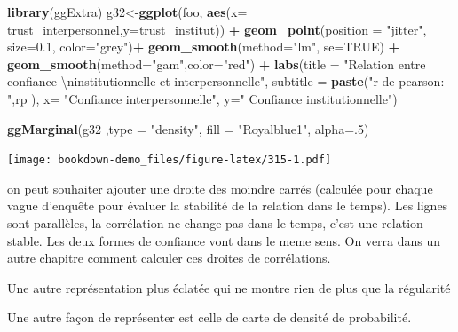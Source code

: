 \documentclass[
]{book}
\newenvironment{Shaded}{\begin{snugshade}}{\end{snugshade}}
\newcommand{\CharTok}[1]{\textcolor[rgb]{0.31,0.60,0.02}{#1}}
\newcommand{\DataTypeTok}[1]{\textcolor[rgb]{0.13,0.29,0.53}{#1}}
\newcommand{\DecValTok}[1]{\textcolor[rgb]{0.00,0.00,0.81}{#1}}
\newcommand{\FloatTok}[1]{\textcolor[rgb]{0.00,0.00,0.81}{#1}}
\newcommand{\KeywordTok}[1]{\textcolor[rgb]{0.13,0.29,0.53}{\textbf{#1}}}
\newcommand{\NormalTok}[1]{#1}
\newcommand{\OperatorTok}[1]{\textcolor[rgb]{0.81,0.36,0.00}{\textbf{#1}}}
\newcommand{\OtherTok}[1]{\textcolor[rgb]{0.56,0.35,0.01}{#1}}
\newcommand{\StringTok}[1]{\textcolor[rgb]{0.31,0.60,0.02}{#1}}
\begin{document}
\begin{Shaded}
\begin{Highlighting}[]
\KeywordTok{library}\NormalTok{(ggExtra)}
\NormalTok{g32<-}\KeywordTok{ggplot}\NormalTok{(foo, }\KeywordTok{aes}\NormalTok{(}\DataTypeTok{x=}\NormalTok{ trust_interpersonnel,}\DataTypeTok{y=}\NormalTok{trust_institut)) }\OperatorTok{+}
\StringTok{  }\KeywordTok{geom_point}\NormalTok{(}\DataTypeTok{position =} \StringTok{"jitter"}\NormalTok{, }\DataTypeTok{size=}\FloatTok{0.1}\NormalTok{, }\DataTypeTok{color=}\StringTok{"grey"}\NormalTok{)}\OperatorTok{+}
\StringTok{  }\KeywordTok{geom_smooth}\NormalTok{(}\DataTypeTok{method=}\StringTok{"lm"}\NormalTok{, }\DataTypeTok{se=}\OtherTok{TRUE}\NormalTok{) }\OperatorTok{+}
\StringTok{  }\KeywordTok{geom_smooth}\NormalTok{(}\DataTypeTok{method=}\StringTok{"gam"}\NormalTok{,}\DataTypeTok{color=}\StringTok{"red"}\NormalTok{)     }\OperatorTok{+}
\StringTok{  }\KeywordTok{labs}\NormalTok{(}\DataTypeTok{title =} \StringTok{"Relation entre confiance }\CharTok{\textbackslash{}n}\StringTok{institutionnelle et interpersonnelle"}\NormalTok{, }
       \DataTypeTok{subtitle =} \KeywordTok{paste}\NormalTok{(}\StringTok{"r de pearson: "}\NormalTok{,rp ),}
       \DataTypeTok{x=} \StringTok{"Confiance interpersonnelle"}\NormalTok{,}
       \DataTypeTok{y=}\StringTok{" Confiance institutionnelle"}\NormalTok{)}

\KeywordTok{ggMarginal}\NormalTok{(g32  ,}\DataTypeTok{type =} \StringTok{"density"}\NormalTok{, }\DataTypeTok{fill =} \StringTok{"Royalblue1"}\NormalTok{, }\DataTypeTok{alpha=}\NormalTok{.}\DecValTok{5}\NormalTok{)}
\end{Highlighting}
\end{Shaded}

\texttt{[image: bookdown-demo\_files/figure-latex/315-1.pdf]}

on peut souhaiter ajouter une droite des moindre carrés (calculée pour chaque vague d'enquête pour évaluer la stabilité de la relation dans le temps). Les lignes sont parallèles, la corrélation ne change pas dans le temps, c'est une relation stable. Les deux formes de confiance vont dans le meme sens. On verra dans un autre chapitre comment calculer ces droites de corrélations.

Une autre représentation plus éclatée qui ne montre rien de plus que la régularité

Une autre façon de représenter est celle de carte de densité de probabilité.
\end{document}
